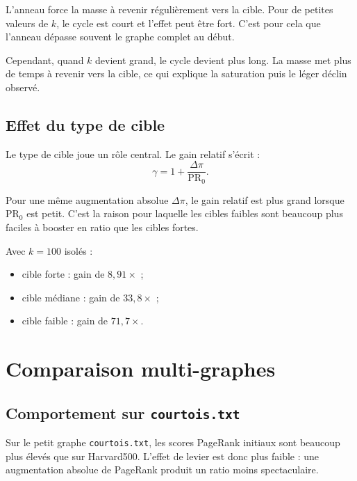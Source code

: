 \documentclass[12pt,a4paper]{article}
\newcommand{\PR}{\mathrm{PR}}
\theoremstyle{definition}
\begin{document}
L'anneau force la masse à revenir régulièrement vers la cible. Pour de petites
valeurs de $k$, le cycle est court et l'effet peut être fort. C'est pour cela
que l'anneau dépasse souvent le graphe complet au début.

Cependant, quand $k$ devient grand, le cycle devient plus long. La masse met
plus de temps à revenir vers la cible, ce qui explique la saturation puis le
léger déclin observé.

\subsection{Effet du type de cible}

Le type de cible joue un rôle central. Le gain relatif s'écrit :
\[
\gamma = 1 + \frac{\Delta \pi}{\PR_0}.
\]

Pour une même augmentation absolue $\Delta \pi$, le gain relatif est plus grand
lorsque $\PR_0$ est petit. C'est la raison pour laquelle les cibles faibles sont
beaucoup plus faciles à booster en ratio que les cibles fortes.

Avec $k=100$ isolés :
\begin{itemize}[noitemsep]
    \item cible forte : gain de $8{,}91\times$ ;
    \item cible médiane : gain de $33{,}8\times$ ;
    \item cible faible : gain de $71{,}7\times$.
\end{itemize}

\section{Comparaison multi-graphes}

\subsection{Comportement sur \texttt{courtois.txt}}

Sur le petit graphe \texttt{courtois.txt}, les scores PageRank initiaux sont
beaucoup plus élevés que sur Harvard500. L'effet de levier est donc plus faible :
une augmentation absolue de PageRank produit un ratio moins spectaculaire.
\end{document}
